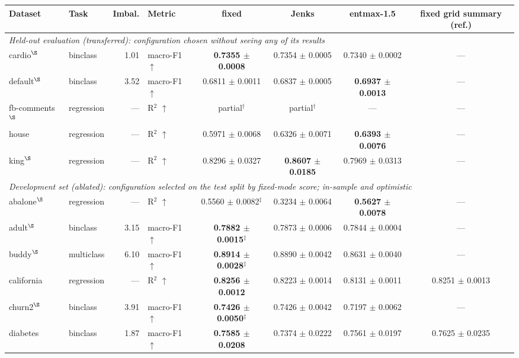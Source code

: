 \begin{table}[t]
\centering\small
\begin{tabular}{llrlcccc}
\toprule
Dataset & Task & Imbal. & Metric & fixed & Jenks & entmax-1.5 & fixed grid summary (ref.) \\
\midrule
\multicolumn{8}{l}{\textit{Held-out evaluation (transferred): configuration chosen without seeing any of its results}} \\
cardio$^\S$ & binclass & 1.01 & macro-F1 $\uparrow$ & \textbf{0.7355 $\pm$ 0.0008} & 0.7354 $\pm$ 0.0005 & 0.7340 $\pm$ 0.0002 & --- \\
default$^\S$ & binclass & 3.52 & macro-F1 $\uparrow$ & 0.6811 $\pm$ 0.0011 & 0.6837 $\pm$ 0.0005 & \textbf{0.6937 $\pm$ 0.0013} & --- \\
fb-comments$^\S$ & regression & — & R$^2$ $\uparrow$ & partial$^\dagger$ & partial$^\dagger$ & --- & --- \\
house & regression & — & R$^2$ $\uparrow$ & 0.5971 $\pm$ 0.0068 & 0.6326 $\pm$ 0.0071 & \textbf{0.6393 $\pm$ 0.0076} & --- \\
king$^\S$ & regression & — & R$^2$ $\uparrow$ & 0.8296 $\pm$ 0.0327 & \textbf{0.8607 $\pm$ 0.0185} & 0.7969 $\pm$ 0.0313 & --- \\
\midrule
\multicolumn{8}{l}{\textit{Development set (ablated): configuration selected on the test split by fixed-mode score; in-sample and optimistic}} \\
abalone$^\S$ & regression & — & R$^2$ $\uparrow$ & 0.5560 $\pm$ 0.0082$^\ddagger$ & 0.3234 $\pm$ 0.0064 & \textbf{0.5627 $\pm$ 0.0078} & --- \\
adult$^\S$ & binclass & 3.15 & macro-F1 $\uparrow$ & \textbf{0.7882 $\pm$ 0.0015}$^\ddagger$ & 0.7873 $\pm$ 0.0006 & 0.7844 $\pm$ 0.0004 & --- \\
buddy$^\S$ & multiclass & 6.10 & macro-F1 $\uparrow$ & \textbf{0.8914 $\pm$ 0.0028}$^\ddagger$ & 0.8890 $\pm$ 0.0042 & 0.8631 $\pm$ 0.0040 & --- \\
california & regression & — & R$^2$ $\uparrow$ & \textbf{0.8256 $\pm$ 0.0012} & 0.8223 $\pm$ 0.0014 & 0.8131 $\pm$ 0.0011 & 0.8251 $\pm$ 0.0013 \\
churn2$^\S$ & binclass & 3.91 & macro-F1 $\uparrow$ & \textbf{0.7426 $\pm$ 0.0050}$^\ddagger$ & 0.7426 $\pm$ 0.0042 & 0.7197 $\pm$ 0.0062 & --- \\
diabetes & binclass & 1.87 & macro-F1 $\uparrow$ & \textbf{0.7585 $\pm$ 0.0208} & 0.7374 $\pm$ 0.0222 & 0.7561 $\pm$ 0.0197 & 0.7625 $\pm$ 0.0235 \\

\end{tabular}
\end{table}
